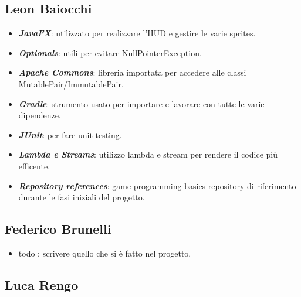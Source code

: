 \subsection*{Leon Baiocchi}

\begin{itemize}
	\item \textbf{\textit{JavaFX}}: utilizzato per realizzare l'HUD e gestire le varie sprites.
	\item \textbf{\textit{Optionals}}: utili per evitare NullPointerException.
	\item \textbf{\textit{Apache Commons}}: libreria importata per accedere alle classi MutablePair/ImmutablePair.
	\item \textbf{\textit{Gradle}}: strumento usato per importare e lavorare con tutte le varie dipendenze.
	\item \textbf{\textit{JUnit}}: per fare unit testing.
	\item \textbf{\textit{Lambda e Streams}}: utilizzo lambda e stream per rendere il codice più efficente.
	\item \textbf{\textit{Repository references}}: \href{https://bitbucket.org/aricci303/2021-game-prog-basics/src/master/}{game-programming-basics}
	repository di riferimento durante le fasi iniziali del progetto.
\end{itemize}

\subsection*{Federico Brunelli}

\begin{itemize}
	\item  todo : scrivere quello che si è fatto nel progetto.
\end{itemize}

\subsection*{Luca Rengo}

